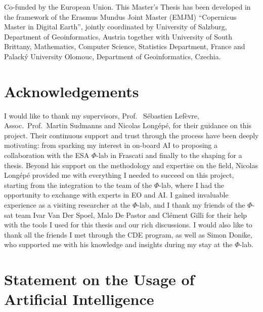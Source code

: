 \documentclass[12pt, a4paper]{report} %
\begin{document}
\newpage\mbox{}\newpage

\vspace*{\fill} Co-funded by the European Union.
This Master’s Thesis has been developed in the framework of the Erasmus Mundus Joint Master (EMJM) “Copernicus Master in Digital Earth”, jointly coordinated by University of Salzburg, Department of Geoinformatics, Austria together with University of South Brittany, Mathematics, Computer Science, Statistics Department, France and Palacký University Olomouc, Department of Geoinformatics, Czechia.
\vspace*{\fill}

\begin{abstract}
    
\end{abstract}

\section*{Acknowledgements}
I would like to thank my supervisors, Prof.
\ Sébastien Lefèvre, Assoc.\ Prof.\ Martin Sudmanns and Nicolas Longépé, for their guidance on this project.
Their continuous support and trust through the process have been deeply motivating: from sparking my interest in on-board AI to proposing a collaboration with the ESA $\Phi$-lab in Frascati and finally to the shaping for a thesis.
Beyond his support on the methodology and expertise on the field, Nicolas Longépé provided me with everything I needed to succeed on this project, starting from the integration to the team of the $\Phi$-lab, where I had the opportunity to exchange with experts in EO and AI.
I gained invaluable experience as a visiting researcher at the $\Phi$-lab, and I thank my friends of the $\Phi$-sat team Ivar Van Der Spoel, Malo De Pastor and Clément Gilli for their help with the tools I used for this thesis and our rich discussions.
I would also like to thank all the friends I met through the CDE program, as well as Simon Donike, who supported me with his knowledge and insights during my stay at the $\Phi$-lab.
\newpage

\section*{Statement on the Usage of Artificial Intelligence}
\end{document}
